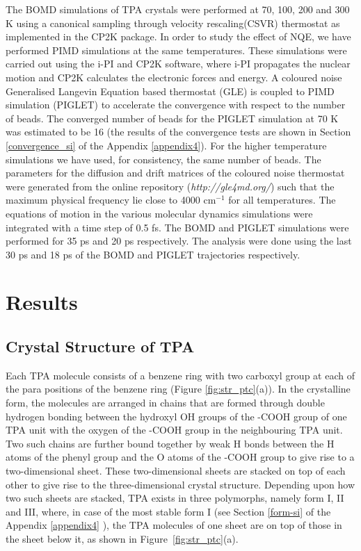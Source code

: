  
The BOMD simulations of TPA crystals were performed at 70, 100, 200 and 300 K
using a canonical sampling through velocity rescaling\cite{bussi2007canonical}(CSVR) 
thermostat as implemented in the CP2K package.
In order to study the effect of NQE, we have performed PIMD simulations at the same
temperatures. These simulations were carried out using the 
i-PI\cite{kapil2019pi} and CP2K software, where i-PI propagates the nuclear motion 
and CP2K calculates the electronic forces and energy. A coloured noise Generalised 
Langevin Equation based thermostat (GLE) is coupled to PIMD 
simulation\cite{ceriotti2012efficient} (PIGLET) to accelerate the convergence 
with respect to the number of beads. The converged number of beads for the 
PIGLET simulation at 70 K was estimated to be 16 (the results of the convergence tests are shown in 
Section \ref{convergence_si} of the Appendix \ref{appendix4}). For the higher temperature simulations we have used, for consistency, the same number of beads. The parameters for the diffusion and drift matrices of the coloured noise thermostat were generated from the online repository (\emph{http://gle4md.org/}) such that the maximum physical frequency lie close to 4000 cm$^{-1}$ for all
temperatures. The equations of motion in the various molecular dynamics simulations were integrated with a time step of 0.5 fs. The BOMD and PIGLET simulations were performed for 35 ps and 20 ps respectively. The analysis were done using the last 30 ps and 18 ps
of the BOMD and PIGLET trajectories respectively.
 
\section{Results}
\label{results}

\subsection{Crystal Structure of TPA}

Each TPA molecule consists of a benzene ring with two carboxyl group at each of
the para positions of the benzene ring (Figure \ref{fig:str_ptc}(a)). In the crystalline form, the 
molecules are arranged in chains that are formed through double hydrogen bonding
between the hydroxyl OH groups of the -COOH group of one TPA unit with the oxygen of the -COOH group in the 
neighbouring TPA unit. Two such chains are further bound together by weak H 
bonds between the H atoms of the phenyl group and the O atoms of the -COOH group
to give rise to a two-dimensional sheet. These two-dimensional sheets are
stacked on top of each other to give rise to the three-dimensional crystal
structure. Depending upon how two such
sheets are stacked, TPA exists in three polymorphs, namely form I, II and III, where, in case of the most stable form I (see Section \ref{form-si} of the Appendix \ref{appendix4} ), the TPA molecules of one sheet are on top of those
in the sheet below it, as shown in Figure~\ref{fig:str_ptc}(a). 

